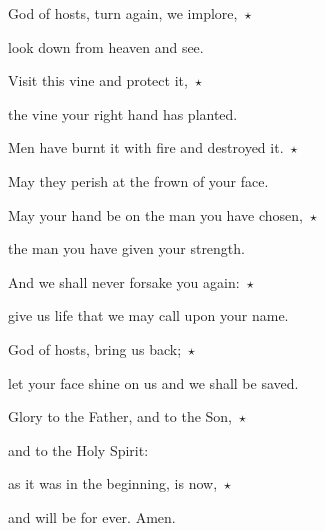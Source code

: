 \noindent God of hosts, turn again, we implore,~$\star$~\nopagebreak

look down from heaven and see.

\noindent Visit this vine and protect it,~$\star$~\nopagebreak

the vine your right hand has planted.

\noindent Men have burnt it with fire and destroyed it.~$\star$~\nopagebreak

May they perish at the frown of your face.

\noindent May your hand be on the man you have chosen,~$\star$~\nopagebreak

the man you have given your strength.

\noindent And we shall never forsake you again:~$\star$~\nopagebreak

give us life that we may call upon your name.

\noindent God of hosts, bring us back;~$\star$~\nopagebreak

let your face shine on us and we shall be saved.

\noindent Glory to the Father, and to the Son,~$\star$~\nopagebreak

and to the Holy Spirit:

\noindent as it was in the beginning, is now,~$\star$~\nopagebreak

and will be for ever. Amen.
